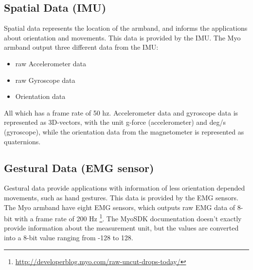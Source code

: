 \subsection{Spatial Data (IMU)}
Spatial data represents the location of the armband, and informs the applications about orientation and movements. This data is provided by the IMU. The Myo armband output three different data from the IMU: 
\begin{itemize}
  \item raw Accelerometer data
  \item raw Gyroscope data
  \item Orientation data
\end{itemize}
All which has a frame rate of 50 hz. Accelerometer data and gyroscope data is represented as 3D-vectors, with the unit g-force (accelerometer) and deg/s (gyroscope), while the orientation data from the magnetometer is represented as quaternions.

\subsection{Gestural Data (EMG sensor)}
\label{subsec:myoEmgSensor}
Gestural data provide applications with information of less orientation depended movements, such as hand gestures. This data is provided by the EMG sensors. The Myo armband have eight EMG sensors, which outputs raw EMG data of 8-bit with a frame rate of 200 Hz \footnote{\url{http://developerblog.myo.com/raw-uncut-drops-today/}}. The MyoSDK documentation \cite{myoSDK} doesn't exactly provide information about the measurement unit, but the values are converted into a 8-bit value ranging from -128 to 128.